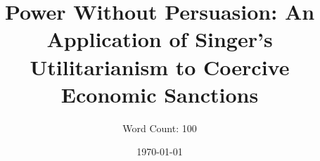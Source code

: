 \documentclass[12pt]{article}
\title{Power Without Persuasion: An Application of Singer's Utilitarianism to Coercive Economic Sanctions}
\author{Word Count: 100}
\date{\today}
\begin{document}
\maketitle

\Blindtext{}

\end{document}

